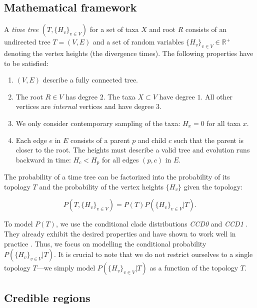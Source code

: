 \documentclass[10pt,letterpaper]{article}
\newcommand{\Pro}[1]{P\left(#1\right)}
\begin{document}
\subsection*{Mathematical framework}

A \emph{time tree} $(T, \{H_v\}_{v \in V})$ for a set of taxa $X$ and root $R$ consists of an undirected tree $T = (V, E)$ and a set of random variables $\{H_v\}_{v \in V} \in \mathbb{R}^+$ denoting the vertex heights (the divergence times). The following properties have to be satisfied:

\begin{enumerate}
	\item $(V, E)$ describe a fully connected tree.
	\item The root $R \in V$ has degree $2$. The taxa $X \subset V$ have degree $1$. All other vertices are \emph{internal} vertices and have degree $3$.
	\item We only consider contemporary sampling of the taxa: $H_x = 0$ for all taxa $x$.
	\item Each edge $e$ in $E$ consists of a parent $p$ and child $c$ such that the parent is closer to the root. The heights must describe a valid tree and evolution runs backward in time: $H_c < H_p$ for all edges $(p, c)$ in $E$.
\end{enumerate}

The probability of a time tree can be factorized into the probability of its topology $T$ and the probability of the vertex heights $\{H_v\}$ given the topology:

$$
\Pro{T, \{H_v\}_{v \in V}} = \Pro{T} \Pro{\{H_v\}_{v \in V} | T}.
$$

To model $\Pro{T}$, we use the conditional clade distributions \emph{CCD0} and \emph{CCD1} \cite{ccd,ccdlarget}. They already exhibit the desired properties and have shown to work well in practice \cite{ccd,ccd0expansion,hipstr}. Thus, we focus on modelling the conditional probability $\Pro{\{H_v\}_{v \in V} | T}$. It is crucial to note that we do not restrict ourselves to a single topology $T$---we simply model $\Pro{\{H_v\}_{v \in V} | T}$ as a function of the topology $T$.

\subsection*{Credible regions}
\end{document}
